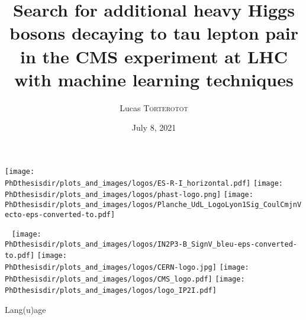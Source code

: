 \documentclass[10pt,aspectratio=169]{beamer}
\institute[IP2I]{Institut de Physique des deux Infinis -- Lyon} %
\title[Search for additional heavy Higgs bosons decaying to tau lepton pair in the CMS experiment...]{Search for additional heavy Higgs bosons decaying to tau lepton pair in the CMS experiment at LHC with machine learning techniques}
\author[Lucas \textsc{Torterotot} -- \mailto{lucas.torterotot@ipnl.in2p3.fr}]{Lucas \textsc{Torterotot}}
\date{July 8, 2021}
\begin{document}
\begin{frame}[noframenumbering] \thispagestyle{empty}
\vspace{-.75cm}

\texttt{[image: \\PhDthesisdir/plots\_and\_images/logos/ES-R-I\_horizontal.pdf]}
\hfill
\texttt{[image: \\PhDthesisdir/plots\_and\_images/logos/phast-logo.png]}
\hfill
\texttt{[image: \\PhDthesisdir/plots\_and\_images/logos/Planche\_UdL\_LogoLyon1Sig\_CoulCmjnVecto-eps-converted-to.pdf]}

\vfill

{
\def\inserttitle{\large Recherche de bosons de Higgs supplémentaires de haute masse se désintégrant en paire de taus dans l'expérience CMS au LHC à l'aide du \emph{machine learning}}
\def\insertmatiere{Soutenance de thèse de doctorat}
\def\insertdate{8 juillet 2021}
\titlepage
}

\vfill

~ \hfill
\texttt{[image: \\PhDthesisdir/plots\_and\_images/logos/IN2P3-B\_SignV\_bleu-eps-converted-to.pdf]}
\hfill
\texttt{[image: \\PhDthesisdir/plots\_and\_images/logos/CERN-logo.jpg]}
\hfill
\texttt{[image: \\PhDthesisdir/plots\_and\_images/logos/CMS\_logo.pdf]}
\hfill
\texttt{[image: \\PhDthesisdir/plots\_and\_images/logos/logo\_IP2I.pdf]}
\hfill ~

\vspace{-.5cm}
\end{frame}

\setcounter{framenumber}{-1}
\begin{frame}{Lang(u)age}
\begin{center}
\end{center}
\end{frame}
\end{document}
